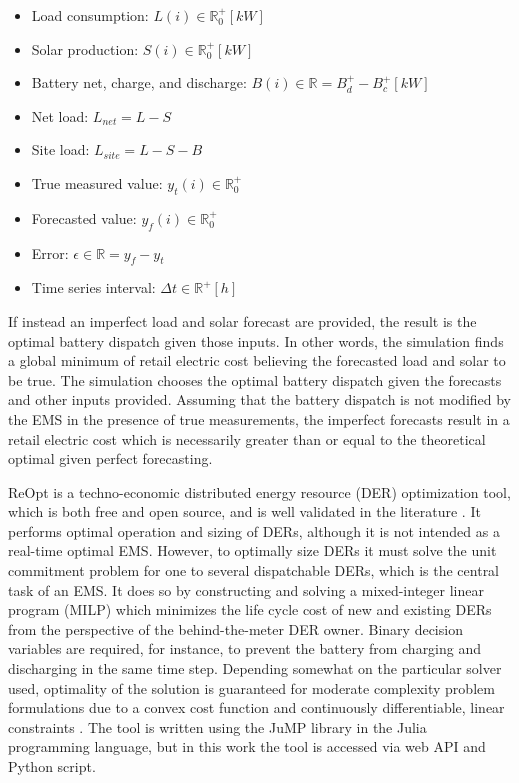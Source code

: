 \documentclass[conference]{IEEEtran}
\begin{document}
\begin{itemize}
    \item Load consumption: $ L(i) \in \mathbb{R}_0^+ [kW]$
    \item Solar production: $ S(i) \in \mathbb{R}_0^+ [kW]$ 
    \item Battery net, charge, and discharge: $ B(i) \in \mathbb{R}  = B_{d}^+ - B_{c}^+ [kW]$
    \item Net load: $ L_{net} = L - S$
    \item Site load: $ L_{site} = L - S - B$
    \item True measured value: $ y_t(i) \in \mathbb{R}_0^+ $
    \item Forecasted value: $ y_f(i) \in \mathbb{R}_0^+ $
    \item Error: $ \epsilon \in \mathbb{R} = y_f - y_t $
    \item Time series interval: $ \Delta t \in \mathbb{R}^+ [h] $
\end{itemize} 

If instead an imperfect load and solar forecast are provided, the result is the optimal battery dispatch given those inputs. In other words, the simulation finds a global minimum of retail electric cost believing the forecasted load and solar to be true. The simulation chooses the optimal battery dispatch given the forecasts and other inputs provided. Assuming that the battery dispatch is not modified by the EMS in the presence of true measurements, the imperfect forecasts result in a retail electric cost which is necessarily greater than or equal to the theoretical optimal given perfect forecasting.

ReOpt is a techno-economic distributed energy resource (DER) optimization tool, which is both free and open source, and is well validated in the literature \cite{b13}. It performs optimal operation and sizing of DERs, although it is not intended as a real-time optimal EMS. However, to optimally size DERs it must solve the unit commitment problem for one to several dispatchable DERs, which is the central task of an EMS. It does so by constructing and solving a mixed-integer linear program (MILP) which minimizes the life cycle cost of new and existing DERs from the perspective of the behind-the-meter DER owner. Binary decision variables are required, for instance, to prevent the battery from charging and discharging in the same time step. Depending somewhat on the particular solver used, optimality of the solution is guaranteed for moderate complexity problem formulations due to a convex cost function and continuously differentiable, linear constraints \cite{b14}. The tool is written using the JuMP library in the Julia programming language, but in this work the tool is accessed via web API and Python script.
\end{document}
